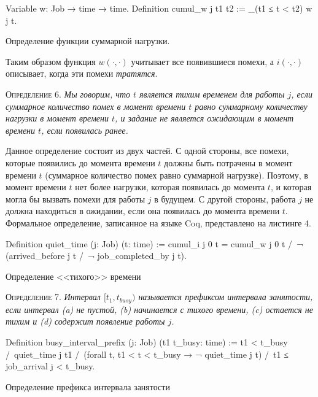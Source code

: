 \documentclass[14pt]{matmex-diploma-custom}
\begin{document}
\begin{listing} 
\begin{pyglist}[numbers=none,numbersep=5pt, fontsize=\small]
  Variable w: Job → time → time.
  Definition cumul_w j t1 t2 := 
    \sum_(t1 ≤ t < t2) w j t.
\end{pyglist}
\caption{Определение функции суммарной нагрузки.}
\label{lst:theorem2}   
\end{listing}

Таким образом функция $w(\cdot,\cdot)$ учитывает все 
  появившиеся помехи, а $i(\cdot,\cdot)$ описывает, когда эти помехи \textit{тратятся}. 

\textsc{Определение 6.}
\textit{Мы говорим, что $t$ является тихим временем для работы $j$, если суммарное
  количество помех в момент времени $t$ равно суммарному количеству нагрузки в момент 
  времени $t$, и задание не является ожидающим в момент времени $t$, если появилась
  ранее.
}

Данное определение состоит из двух частей. С одной стороны, все помехи, которые появились 
  до момента времени $t$ должны быть потрачены в момент времени $t$ (суммарное количество 
  помех равно суммарной нагрузке). Поэтому, в момент времени $t$ нет более нагрузки, 
  которая появилась до момента $t$, и которая могла бы вызвать помехи для работы $j$ 
  в будущем. С другой стороны, работа $j$ не должна находиться в ожидании, если она 
  появилась до момента времени $t$. Формальное определение, записанное на языке Coq, представлено на листинге 4.
\begin{listing} 
\begin{pyglist}[numbers=none,numbersep=5pt, fontsize=\small]
  Definition quiet_time (j: Job) (t: time) :=
    cumul_i j 0 t = cumul_w j 0 t /\ 
    ¬ (arrived_before j t /\ ¬ job_completed_by j t).
\end{pyglist}
\caption{Определение <<тихого>> времени}
\label{lst:theorem2}   
\end{listing}

\textsc{Определение 7.}
\textit{Интервал $[t_1, t_{busy})$ называется префиксом интервала занятости, 
  если интервал (a) не пустой, (b) начинается с тихого 
  времени, (c) остается не тихим и (d) содержит появление работы $j$. 
}


\begin{listing} 
\begin{pyglist}[numbers=none,numbersep=5pt, fontsize=\small]
  Definition busy_interval_prefix (j: Job) (t1 t_busy: time) :=
    t1 < t_busy /\
    quiet_time j t1 /\
    (forall t, t1 < t < t_busy → ¬ quiet_time j t) /\
    t1 ≤ job_arrival j < t_busy.
\end{pyglist}
\caption{Определение префикса интервала занятости}
\label{lst:theorem2}   
\end{listing}
\end{document}
